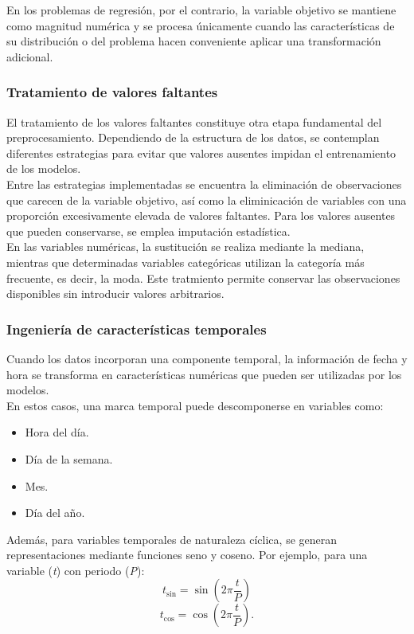 \documentclass[a4paper,12pt,twoside,final]{book}
\begin{document}
En los problemas de regresión, por el contrario, la variable objetivo se mantiene como magnitud numérica y se
procesa únicamente cuando las características de su distribución o del problema hacen conveniente aplicar una
transformación adicional.

\subsubsection{Tratamiento de valores faltantes}
El tratamiento de los valores faltantes constituye otra etapa fundamental del preprocesamiento. Dependiendo de la
estructura de los datos, se contemplan diferentes estrategias para evitar que valores ausentes impidan el entrenamiento
de los modelos.\\

Entre las estrategias implementadas se encuentra la eliminación de observaciones que carecen de la variable objetivo,
así como la eliminicación de variables con una proporción excesivamente elevada de valores faltantes. Para los valores
ausentes que pueden conservarse, se emplea imputación estadística.\\

En las variables numéricas, la sustitución se realiza mediante la mediana, mientras que determinadas variables
categóricas utilizan la categoría más frecuente, es decir, la moda. Este tratmiento permite conservar las observaciones
disponibles sin introducir valores arbitrarios.

\subsubsection{Ingeniería de características temporales}
Cuando los datos incorporan una componente temporal, la información de fecha y hora se transforma en características
numéricas que pueden ser utilizadas por los modelos.\\

En estos casos, una marca temporal puede descomponerse en variables como:
\begin{itemize}
  \item Hora del día.
  \item Día de la semana.
  \item Mes.
  \item Día del año.
\end{itemize}

Además, para variables temporales de naturaleza cíclica, se generan representaciones mediante funciones seno y coseno.
Por ejemplo, para una variable (\textit{t}) con periodo (\textit{P}):
\[
 t_{\sin} = \sin\left(2\pi\frac{t}{P}\right)
\]
\[
 t_{\cos} = \cos\left(2\pi\frac{t}{P}\right).
\]
\end{document}
